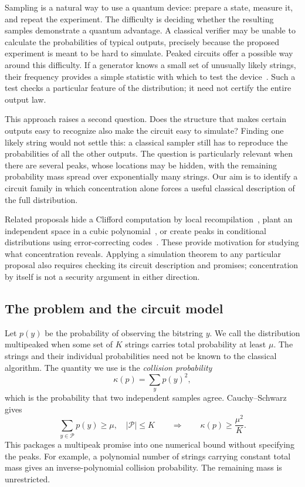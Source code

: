 \documentclass[a4paper,onecolumn,11pt,unpublished]{quantumarticle}
\theoremstyle{plain}
\theoremstyle{remark}
\begin{document}
Sampling is a natural way to use a quantum device: prepare a state, measure it, and repeat the experiment. The difficulty is deciding whether the resulting samples demonstrate a quantum advantage. A classical verifier may be unable to calculate the probabilities of typical outputs, precisely because the proposed experiment is meant to be hard to simulate. Peaked circuits offer a possible way around this difficulty. If a generator knows a small set of unusually likely strings, their frequency provides a simple statistic with which to test the device~\cite{AZ24,Zha25,GMS25}. Such a test checks a particular feature of the distribution; it need not certify the entire output law.

This approach raises a second question. Does the structure that makes certain outputs easy to recognize also make the circuit easy to simulate? Finding one likely string would not settle this: a classical sampler still has to reproduce the probabilities of all the other outputs. The question is particularly relevant when there are several peaks, whose locations may be hidden, with the remaining probability mass spread over exponentially many strings. Our aim is to identify a circuit family in which concentration alone forces a useful classical description of the full distribution.

Related proposals hide a Clifford computation by local recompilation~\cite{Yan26}, plant an independent space in a cubic polynomial~\cite{BGHLQ26}, or create peaks in conditional distributions using error-correcting codes~\cite{DFGG25}. These provide motivation for studying what concentration reveals. Applying a simulation theorem to any particular proposal also requires checking its circuit description and promises; concentration by itself is not a security argument in either direction.

\subsection{The problem and the circuit model}

Let $p(y)$ be the probability of observing the bitstring $y$. We call the distribution multipeaked when some set of $K$ strings carries total probability at least $\mu$. The strings and their individual probabilities need not be known to the classical algorithm. The quantity we use is the \emph{collision probability}
\[
\kappa(p)=\sum_y p(y)^2,
\]
which is the probability that two independent samples agree. Cauchy--Schwarz gives
\[
\sum_{y\in\mathcal P}p(y)\ge\mu,\quad |\mathcal P|\le K
\qquad\Longrightarrow\qquad
\kappa(p)\ge\frac{\mu^2}{K}.
\]
This packages a multipeak promise into one numerical bound without specifying the peaks. For example, a polynomial number of strings carrying constant total mass gives an inverse-polynomial collision probability. The remaining mass is unrestricted.
\end{document}
